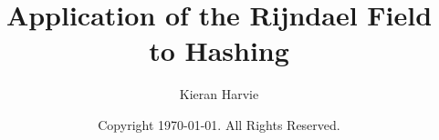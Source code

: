 \documentclass[12pt]{report}
\title{Application of the Rijndael Field to Hashing}
\date{Copyright \textcopyright  \today. All Rights Reserved.}
\author{Kieran Harvie}
\begin{document}
\maketitle
\tableofcontents







\renewcommand{\thechapter}{A}

\end{document}
